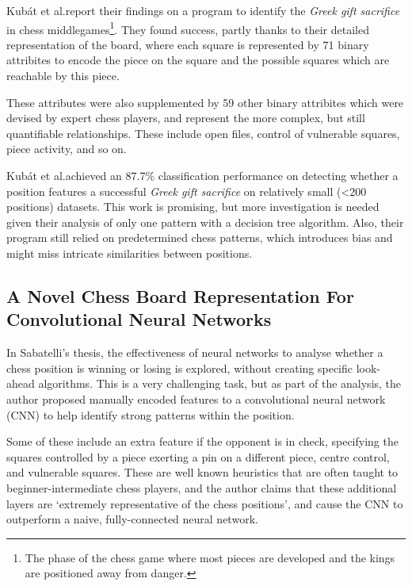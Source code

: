 Kub\'{a}t et al.\@ report their findings on a program \cite{middlegamePatterns}
to identify the \emph{Greek gift sacrifice} in chess middlegames\footnote{The
phase of the chess game where most pieces are developed and the kings are
positioned away from danger.}. They found success, partly thanks to their
detailed representation of the board, where each square is represented by 71
binary attribites \cite{middlegamePatterns} to encode the piece on the square
and the possible squares which are reachable by this piece. 

These attributes were also supplemented by 59 other binary attribites which
were devised by expert chess players, and represent the more complex, but still
quantifiable relationships.\cite{middlegamePatterns} These include open files,
control of vulnerable squares, piece activity, and so on.

Kub\'{a}t et al.\@ achieved an 87.7\% classification performance on detecting
whether a position features a successful \emph{Greek gift sacrifice} on
relatively small (<200 positions) datasets. This work is promising, but more
investigation is needed given their analysis of only one pattern with a
decision tree algorithm. Also, their program still relied on predetermined
chess patterns, which introduces bias and might miss intricate similarities
between positions.

\subsection{A Novel Chess Board Representation For Convolutional Neural Networks}

In Sabatelli's thesis,\cite{chessCNN} the effectiveness of neural networks to
analyse whether a chess position is winning or losing is explored, without
creating specific look-ahead algorithms. This is a very challenging task, but
as part of the analysis, the author proposed manually encoded features to a
convolutional neural network (CNN) to help identify strong patterns within the
position. 

Some of these include an extra feature if the opponent is in check, specifying
the squares controlled by a piece exerting a pin on a different piece, centre
control, and vulnerable squares.\cite{chessCNN} These are well known
heuristics that are often taught to beginner-intermediate chess players, and
the author claims that these additional layers are `extremely representative
of the chess positions', and cause the CNN to outperform a naive,
fully-connected neural network.

